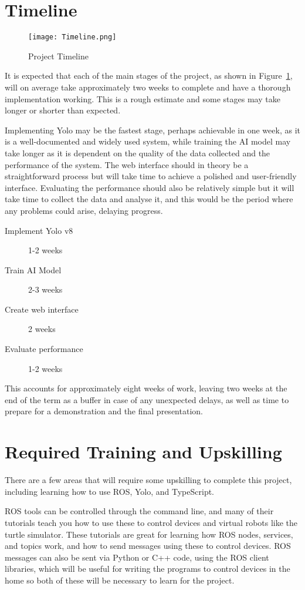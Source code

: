 \section{Timeline}

\begin{figure}[!htb]
    \caption{Project Timeline}
    \centering
    \texttt{[image: Timeline.png]}
    \label{fig:timeline}
\end{figure}

It is expected that each of the main stages of the project, as shown in Figure~\ref{fig:timeline}, will on average take approximately two weeks to complete and have a thorough implementation working.
This is a rough estimate and some stages may take longer or shorter than expected.

Implementing Yolo may be the fastest stage, perhaps achievable in one week, as it is a well-documented and widely used system, while training the AI model may take longer as it is dependent on the quality of the data collected and the performance of the system.
The web interface should in theory be a straightforward process but will take time to achieve a polished and user-friendly interface.
Evaluating the performance should also be relatively simple but it will take time to collect the data and analyse it, and this would be the period where any problems could arise, delaying progress.

\begin{description}
    \item[Implement Yolo v8] 1-2 weeks
    \item[Train AI Model] 2-3 weeks
    \item[Create web interface] 2 weeks
    \item[Evaluate performance] 1-2 weeks    
\end{description}

This accounts for approximately eight weeks of work, leaving two weeks at the end of the term as a buffer in case of any unexpected delays, as well as time to prepare for a demonstration and the final presentation.

\section{Required Training and Upskilling}
There are a few areas that will require some upskilling to complete this project, including learning how to use ROS, Yolo, and TypeScript.

ROS tools can be controlled through the command line, and many of their tutorials teach you how to use these to control devices and virtual robots like the turtle simulator.
These tutorials are great for learning how ROS nodes, services, and topics work, and how to send messages using these to control devices.
ROS messages can also be sent via Python or C++ code, using the ROS client libraries, which will be useful for writing the programs to control devices in the home so both of these will be necessary to learn for the project.

